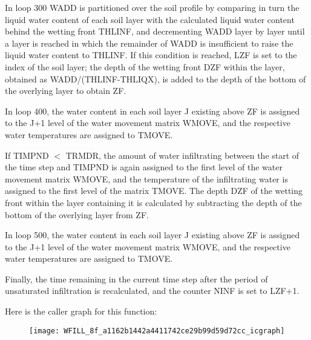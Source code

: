 In loop 300 W\+A\+D\+D is partitioned over the soil profile by comparing in turn the liquid water content of each soil layer with the calculated liquid water content behind the wetting front T\+H\+L\+I\+N\+F, and decrementing W\+A\+D\+D layer by layer until a layer is reached in which the remainder of W\+A\+D\+D is insufficient to raise the liquid water content to T\+H\+L\+I\+N\+F. If this condition is reached, L\+Z\+F is set to the index of the soil layer; the depth of the wetting front D\+Z\+F within the layer, obtained as W\+A\+D\+D/(T\+H\+L\+I\+N\+F-\/\+T\+H\+L\+I\+Q\+X), is added to the depth of the bottom of the overlying layer to obtain Z\+F.

In loop 400, the water content in each soil layer J existing above Z\+F is assigned to the J+1 level of the water movement matrix W\+M\+O\+V\+E, and the respective water temperatures are assigned to T\+M\+O\+V\+E.

If T\+I\+M\+P\+N\+D $<$ T\+R\+M\+D\+R, the amount of water infiltrating between the start of the time step and T\+I\+M\+P\+N\+D is again assigned to the first level of the water movement matrix W\+M\+O\+V\+E, and the temperature of the infiltrating water is assigned to the first level of the matrix T\+M\+O\+V\+E. The depth D\+Z\+F of the wetting front within the layer containing it is calculated by subtracting the depth of the bottom of the overlying layer from Z\+F.

In loop 500, the water content in each soil layer J existing above Z\+F is assigned to the J+1 level of the water movement matrix W\+M\+O\+V\+E, and the respective water temperatures are assigned to T\+M\+O\+V\+E.

Finally, the time remaining in the current time step after the period of unsaturated infiltration is recalculated, and the counter N\+I\+N\+F is set to L\+Z\+F+1.

Here is the caller graph for this function\+:\nopagebreak
\begin{figure}[H]
\begin{center}
\leavevmode
\texttt{[image: WFILL\_8f\_a1162b1442a4411742ce29b99d59d72cc\_icgraph]}
\end{center}
\end{figure}


